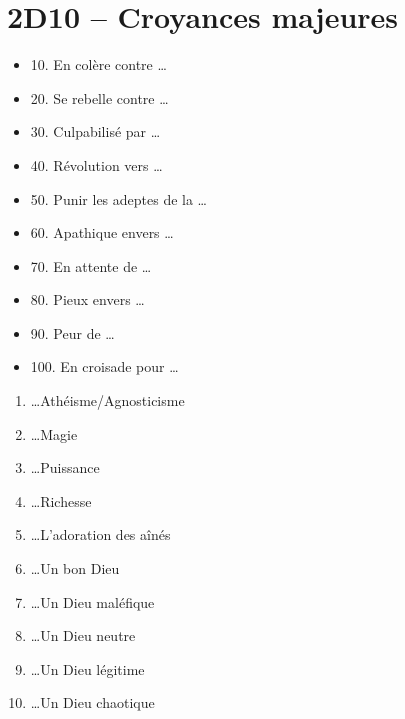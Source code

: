 \documentclass{article}
\begin{document}
\section*{2D10 -- Croyances majeures}
\begin{multicols}{2}
	\renewcommand{\labelitemi}{}
	\begin{itemize}
		\item 10. En colère contre \ldots
		\item 20. Se rebelle contre \ldots
		\item 30. Culpabilisé par \ldots
		\item 40. Révolution vers \ldots
		\item 50. Punir les adeptes de la \ldots
		\item 60. Apathique envers \ldots
		\item 70. En attente de \ldots
		\item 80. Pieux envers \ldots
		\item 90. Peur de \ldots
		\item 100. En croisade pour \ldots
	\end{itemize}
	\begin{enumerate}
		\item \ldots Athéisme/Agnosticisme
		\item \ldots Magie
		\item \ldots Puissance
		\item \ldots Richesse
		\item \ldots L'adoration des aînés
		\item \ldots Un bon Dieu
		\item \ldots Un Dieu maléfique
		\item \ldots Un Dieu neutre
		\item \ldots Un Dieu légitime
		\item \ldots Un Dieu chaotique
	\end{enumerate}
\end{multicols}
\end{document}
